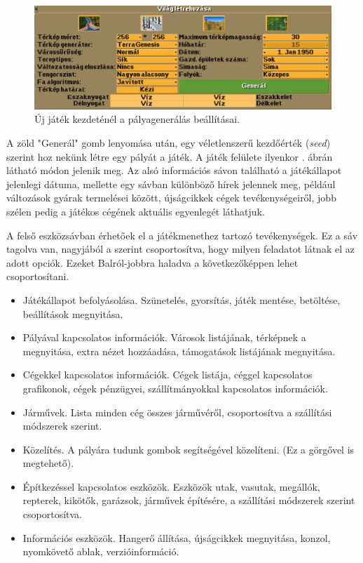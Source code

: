 \begin{figure}
	\centering
	\includegraphics[width=\textwidth]{images/generalas.png}
	\caption{Új játék kezdeténél a pályagenerálás beállításai.}
	\label{fig:generalas}
\end{figure}

A zöld "Generál" gomb lenyomása után, egy véletlenszerű kezdőérték (\textit{seed}) szerint hoz nekünk létre egy pályát a játék. A játék felülete ilyenkor . ábrán látható módon jelenik meg. Az alsó információs sávon található a játékállapot jelenlegi dátuma, mellette egy sávban különböző hírek jelennek meg, például változások gyárak termelései között, újságcikkek cégek tevékenységeiről, jobb szélen pedig a játékos cégének aktuális egyenlegét láthatjuk.

A felső eszközsávban érhetőek el a játékmenethez tartozó tevékenységek. Ez a sáv tagolva van, nagyjából a szerint csoportosítva, hogy milyen feladatot látnak el az adott opciók. Ezeket Balról-jobbra haladva a következőképpen lehet csoportosítani.
\begin{itemize}
	\item Játékállapot befolyásolása. Szünetelés, gyorsítás, játék mentése, betöltése, beállítások megnyitása.
	\item Pályával kapcsolatos információk. Városok listájának, térképnek a  megnyitása, extra nézet hozzáadása, támogatások listájának megnyitása.
	\item Cégekkel kapcsolatos információk. Cégek listája, céggel kapcsolatos grafikonok, cégek pénzügyei, szállítmányokkal kapcsolatos információk.
	\item Járművek. Lista minden cég összes járművéről, csoportosítva a szállítási módszerek szerint.
	\item Közelítés. A pályára tudunk gombok segítségével közelíteni. (Ez a görgővel is megtehető).
	\item Építkezéssel kapcsolatos eszközök. Eszközök utak, vasutak, megállók, repterek, kikötők, garázsok, járművek építésére, a szállítási módszerek szerint csoportosítva.
	\item Információs eszközök. Hangerő állítása, újságcikkek megnyitása, konzol, nyomkövető ablak, verzióinformáció.
\end{itemize}

